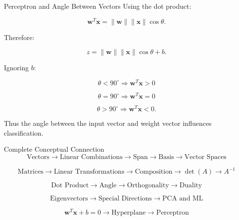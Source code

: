 \documentclass[aspectratio=169]{beamer}
\begin{document}
\begin{frame}{Perceptron and Angle Between Vectors}
Using the dot product:

\[
\mathbf w^T\mathbf x
=
\|\mathbf w\|\|\mathbf x\|\cos\theta.
\]

Therefore:

\[
z=
\|\mathbf w\|\|\mathbf x\|\cos\theta+b.
\]

Ignoring $b$:

\[
\theta<90^\circ
\Rightarrow
\mathbf w^T\mathbf x>0
\]

\[
\theta=90^\circ
\Rightarrow
\mathbf w^T\mathbf x=0
\]

\[
\theta>90^\circ
\Rightarrow
\mathbf w^T\mathbf x<0.
\]

Thus the angle between the input vector and weight vector influences classification.
\end{frame}

\begin{frame}{Complete Conceptual Connection}
\[
\boxed{
\text{Vectors}
\rightarrow
\text{Linear Combinations}
\rightarrow
\text{Span}
\rightarrow
\text{Basis}
\rightarrow
\text{Vector Spaces}
}
\]

\[
\boxed{
\text{Matrices}
\rightarrow
\text{Linear Transformations}
\rightarrow
\text{Composition}
\rightarrow
\det(A)
\rightarrow
A^{-1}
}
\]

\[
\boxed{
\text{Dot Product}
\rightarrow
\text{Angle}
\rightarrow
\text{Orthogonality}
\rightarrow
\text{Duality}
}
\]

\[
\boxed{
\text{Eigenvectors}
\rightarrow
\text{Special Directions}
\rightarrow
\text{PCA and ML}
}
\]

\[
\boxed{
\mathbf w^T\mathbf x+b=0
\rightarrow
\text{Hyperplane}
\rightarrow
\text{Perceptron}
}
\]
\end{frame}
\end{document}

